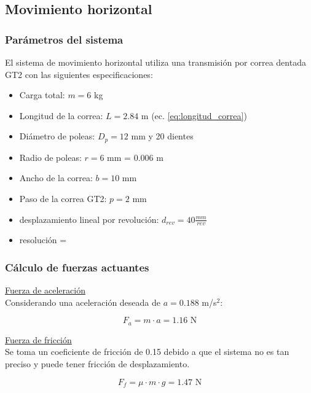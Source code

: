 \subsection{Movimiento horizontal}

\subsubsection{Parámetros del sistema}

El sistema de movimiento horizontal utiliza una transmisión por correa dentada GT2 con las siguientes especificaciones:

\begin{itemize}[label=$\bullet$]
    \item Carga total: $m = 6$ kg
    \item Longitud de la correa: $L = 2.84$ m (ec. \ref{eq:longitud_correa})
    \item Diámetro de poleas: $D_p = 12$ mm y 20 dientes
    \item Radio de poleas: $r = 6$ mm = $0.006$ m
    \item Ancho de la correa: $b = 10$ mm
    \item Paso de la correa GT2: $p = 2$ mm
    \item desplazamiento lineal por revolución: $d_{rev} = 40 \frac{mm}{rev}$
    \item resolución = 
\end{itemize}

\subsubsection{Cálculo de fuerzas actuantes}

\underline{Fuerza de aceleración}\\

Considerando una aceleración deseada de $a = 0.188$ m/s$^2$:

\begin{equation}
    F_a = m \cdot a = 1.16\text{ N}
\end{equation}

\underline{Fuerza de fricción}\\

Se toma un coeficiente de fricción de 0.15 debido a que el sistema no es tan preciso y puede tener fricción de desplazamiento.

\begin{equation}
    F_f = \mu \cdot m \cdot g = 1.47 \text{ N}
\end{equation}

